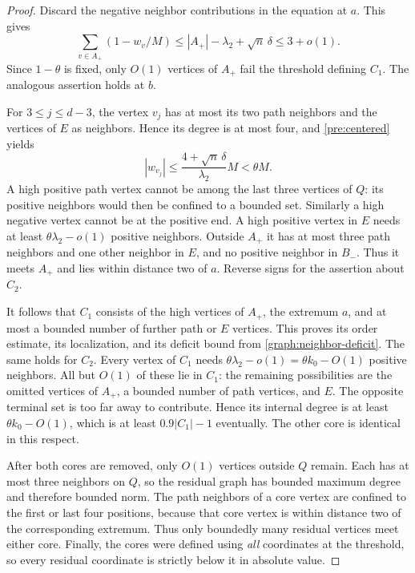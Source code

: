 \documentclass[11pt,a4paper]{article}
\numberwithin{equation}{section}
\theoremstyle{definition}
\theoremstyle{remark}
\begin{document}
\begin{proof}
Discard the negative neighbor contributions in the equation at $a$.
This gives
\begin{equation}\label{graph:neighbor-deficit}
 \sum_{v\in A_+}(1-w_v/M)
 \le |A_+|-\lambda_2+\sqrt n\,\delta\le3+o(1).
\end{equation}
Since $1-\theta$ is fixed, only $O(1)$ vertices of $A_+$ fail the
threshold defining $C_1$. The analogous assertion holds at $b$.

For $3\le j\le d-3$, the vertex $v_j$ has at most its two path
neighbors and the vertices of $E$ as neighbors. Hence its degree is at
most four, and \eqref{pre:centered} yields
\[
 |w_{v_j}|\le\frac{4+\sqrt n\,\delta}{\lambda_2}M<\theta M.
\]
A high positive path vertex cannot be among the last three vertices of
$Q$: its positive neighbors would then be confined to a bounded set.
Similarly a high negative vertex cannot be at the positive end.
A high positive vertex in $E$ needs at least
$\theta\lambda_2-o(1)$ positive neighbors. Outside $A_+$ it has at
most three path neighbors and one other neighbor in $E$, and no positive
neighbor in $B_-$. Thus it meets $A_+$ and lies within distance two of
$a$. Reverse signs for the assertion about $C_2$.

It follows that $C_1$ consists of the high vertices of $A_+$, the
extremum $a$, and at most a bounded number of further path or $E$
vertices. This proves its order estimate, its localization, and its
deficit bound from \eqref{graph:neighbor-deficit}. The same holds for
$C_2$. Every vertex of $C_1$ needs
$\theta\lambda_2-o(1)=\theta k_0-O(1)$ positive neighbors. All but
$O(1)$ of these lie in $C_1$: the remaining possibilities are the
omitted vertices of $A_+$, a bounded number of path vertices, and $E$.
The opposite terminal set is too far away to contribute. Hence its
internal degree is at least $\theta k_0-O(1)$, which is at least
$0.9|C_1|-1$ eventually. The other core is identical in this respect.

After both cores are removed, only $O(1)$ vertices outside $Q$ remain.
Each has at most three neighbors on $Q$, so the residual graph has
bounded maximum degree and therefore bounded norm. The path neighbors
of a core vertex are confined to the first or last four positions,
because that core vertex is within distance two of the corresponding
extremum. Thus only boundedly many residual vertices meet either core.
Finally, the cores were defined using \emph{all} coordinates at the
threshold, so every residual coordinate is strictly below it in absolute
value.
\end{proof}
\end{document}
